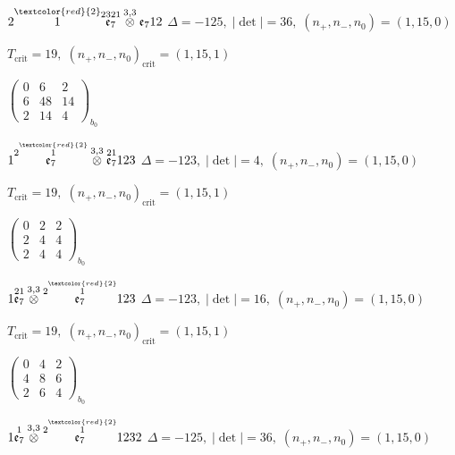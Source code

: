 \documentclass[10pt]{article}
\begin{document}
$2\overset{\textcolor{red}{2}}{1}\overset{2321}{\mathfrak{e}_7}\overset{3,3}{\otimes}\mathfrak{e}_712$ \quad $\Delta=-125,\; |\det|=36,\; (n_+,n_-,n_0)=(1,15,0)$

\hspace{1em}$T_{\text{crit}}=19,\; (n_+,n_-,n_0)_{\text{crit}}=(1,15,1)$

\hspace{2em}$\left(\begin{smallmatrix}0 & 6 & 2 \\ 6 & 48 & 14 \\ 2 & 14 & 4\end{smallmatrix}\right)_{\!b_0}$

\smallskip

$1\overset{2\overset{\textcolor{red}{2}}{1}}{\mathfrak{e}_7}\overset{3,3}{\otimes}\overset{21}{\mathfrak{e}_7}123$ \quad $\Delta=-123,\; |\det|=4,\; (n_+,n_-,n_0)=(1,15,0)$

\hspace{1em}$T_{\text{crit}}=19,\; (n_+,n_-,n_0)_{\text{crit}}=(1,15,1)$

\hspace{2em}$\left(\begin{smallmatrix}0 & 2 & 2 \\ 2 & 4 & 4 \\ 2 & 4 & 4\end{smallmatrix}\right)_{\!b_0}$

$1\overset{21}{\mathfrak{e}_7}\overset{3,3}{\otimes}\overset{2\overset{\textcolor{red}{2}}{1}}{\mathfrak{e}_7}123$ \quad $\Delta=-123,\; |\det|=16,\; (n_+,n_-,n_0)=(1,15,0)$

\hspace{1em}$T_{\text{crit}}=19,\; (n_+,n_-,n_0)_{\text{crit}}=(1,15,1)$

\hspace{2em}$\left(\begin{smallmatrix}0 & 4 & 2 \\ 4 & 8 & 6 \\ 2 & 6 & 4\end{smallmatrix}\right)_{\!b_0}$

\smallskip

$1\overset{1}{\mathfrak{e}_7}\overset{3,3}{\otimes}\overset{2\overset{\textcolor{red}{2}}{1}}{\mathfrak{e}_7}1232$ \quad $\Delta=-125,\; |\det|=36,\; (n_+,n_-,n_0)=(1,15,0)$
\end{document}

